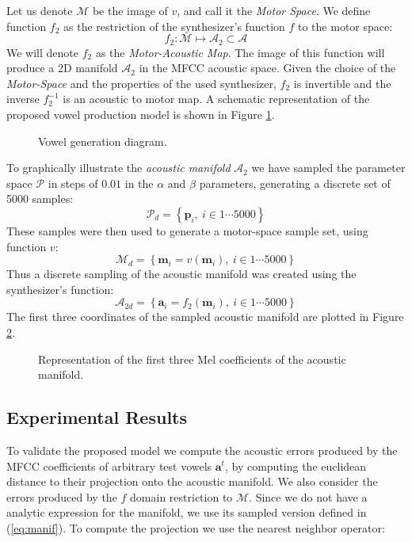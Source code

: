 Let us denote $\mathcal{M}$ be the image of $v$, and call it the
\textit{Motor Space}. We define function $f_2$ as the restriction of
the synthesizer's function $f$ to the motor space:
\begin{equation}
f_2 : \mathcal{M} \mapsto \mathcal{A}_2 \subset \mathcal{A}
\end{equation} 
We will denote $f_2$ as the \textit{Motor-Acoustic Map}. The image of
this function will produce a 2D manifold $\mathcal{A}_2$ in the MFCC
acoustic space. Given the choice of the \textit{Motor-Space} and the
properties of the used synthesizer, $f_2$ is invertible and the
inverse $f_{2}^{-1}$ is an acoustic to motor map. A schematic
representation of the proposed vowel production model is shown in
Figure \ref{fig:diagram}.
\begin{figure}[!ht]
  \centering
  \caption{Vowel generation diagram.}
  \label{fig:diagram}
\end{figure}

To graphically illustrate the \textit{acoustic manifold}
$\mathcal{A}_2$ we have sampled the parameter space $\mathcal{P}$ in
steps of $0.01$ in the $\alpha$ and $\beta$ parameters, generating a
discrete set of 5000 samples:
\begin{equation*}
\mathcal{P}_d = \left\{ \mathbf{p}_i,\ i \in 1 \cdots 5000 \right\}
\end{equation*} 
These samples were then used to generate a motor-space sample set,
using function $v$:
\begin{equation*}
\mathcal{M}_d = \left\{ \mathbf{m}_i = v(\mathbf{m}_i),\  i \in 1 \cdots 5000 \right\}
\end{equation*} 
Thus a discrete sampling of the acoustic manifold was created using
the synthesizer's function:
\begin{equation}
\mathcal{A}_{2d} = \left\{ \mathbf{a}_i = f_2(\mathbf{m}_i), \ i \in 1 \cdots 5000 \right\}
\label{eq:manif}
\end{equation} 
The first three coordinates of the sampled acoustic manifold are
plotted in Figure \ref{fig:manif}.
\begin{figure}[!h]
\hspace{-1cm}
  \caption{Representation of the first three Mel coefficients of the
    acoustic manifold.}
  \label{fig:manif}
\end{figure}

\subsection{Experimental Results}
To validate the proposed model we compute the acoustic errors produced
by the MFCC coefficients of arbitrary test vowels $\mathbf{a}^t$, by
computing the euclidean distance to their projection onto the acoustic
manifold. We also consider the errors produced by the $f$ domain
restriction to $\mathcal{M}$. Since we do not have a analytic
expression for the manifold, we use its sampled version defined in
(\ref{eq:manif}). To compute the projection we use the nearest
neighbor operator:


